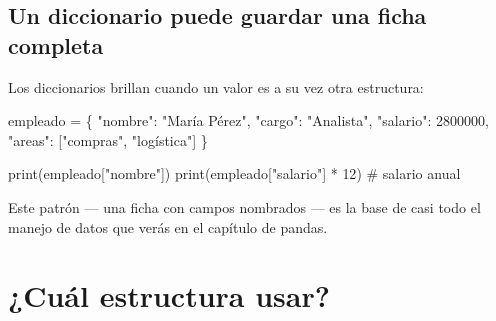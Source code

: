 \documentclass[
  spanish,
  letterpaper,
  DIV=11,
  numbers=noendperiod]{scrreprt}
\newenvironment{Shaded}{\begin{snugshade}}{\end{snugshade}}
\newcommand{\BuiltInTok}[1]{\textcolor[rgb]{0.00,0.23,0.31}{#1}}
\newcommand{\CommentTok}[1]{\textcolor[rgb]{0.37,0.37,0.37}{#1}}
\newcommand{\DecValTok}[1]{\textcolor[rgb]{0.68,0.00,0.00}{#1}}
\newcommand{\NormalTok}[1]{\textcolor[rgb]{0.00,0.23,0.31}{#1}}
\newcommand{\OperatorTok}[1]{\textcolor[rgb]{0.37,0.37,0.37}{#1}}
\newcommand{\StringTok}[1]{\textcolor[rgb]{0.13,0.47,0.30}{#1}}
\begin{document}
\subsection{Un diccionario puede guardar una ficha
completa}\label{un-diccionario-puede-guardar-una-ficha-completa}

Los diccionarios brillan cuando un valor es a su vez otra estructura:

\begin{Shaded}
\begin{Highlighting}[]
\NormalTok{empleado }\OperatorTok{=}\NormalTok{ \{}
    \StringTok{"nombre"}\NormalTok{: }\StringTok{"María Pérez"}\NormalTok{,}
    \StringTok{"cargo"}\NormalTok{: }\StringTok{"Analista"}\NormalTok{,}
    \StringTok{"salario"}\NormalTok{: }\DecValTok{2800000}\NormalTok{,}
    \StringTok{"areas"}\NormalTok{: [}\StringTok{"compras"}\NormalTok{, }\StringTok{"logística"}\NormalTok{]}
\NormalTok{\}}

\BuiltInTok{print}\NormalTok{(empleado[}\StringTok{"nombre"}\NormalTok{])}
\BuiltInTok{print}\NormalTok{(empleado[}\StringTok{"salario"}\NormalTok{] }\OperatorTok{*} \DecValTok{12}\NormalTok{)   }\CommentTok{\# salario anual}
\end{Highlighting}
\end{Shaded}

Este patrón --- una ficha con campos nombrados --- es la base de casi
todo el manejo de datos que verás en el capítulo de pandas.

\section{¿Cuál estructura usar?}\label{cuuxe1l-estructura-usar}
\end{document}
